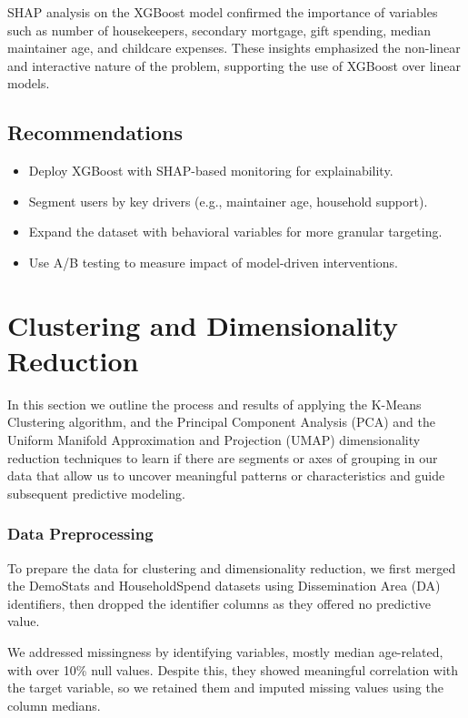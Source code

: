 \documentclass{article}
\begin{document}
SHAP analysis on the XGBoost model confirmed the importance of variables such as number of housekeepers, secondary mortgage, gift spending, median maintainer age, and childcare expenses. These insights emphasized the non-linear and interactive nature of the problem, supporting the use of XGBoost over linear models.

\subsection*{Recommendations}
\begin{itemize}
    \item Deploy XGBoost with SHAP-based monitoring for explainability.
    \item Segment users by key drivers (e.g., maintainer age, household support).
    \item Expand the dataset with behavioral variables for more granular targeting.
    \item Use A/B testing to measure impact of model-driven interventions.
\end{itemize}

\section{Clustering and Dimensionality Reduction}
In this section we outline the process and results of applying the K-Means Clustering algorithm, and the Principal Component Analysis (PCA) and the Uniform Manifold Approximation and Projection (UMAP) dimensionality reduction techniques to learn if there are segments or axes of grouping in our data that allow us to uncover meaningful patterns or characteristics and guide subsequent predictive modeling.

\subsubsection{Data Preprocessing}

To prepare the data for clustering and dimensionality reduction, we first merged the DemoStats and HouseholdSpend datasets using Dissemination Area (DA) identifiers, then dropped the identifier columns as they offered no predictive value.

We addressed missingness by identifying variables, mostly median age-related, with over 10\% null values. Despite this, they showed meaningful correlation with the target variable, so we retained them and imputed missing values using the column medians.
\end{document}
